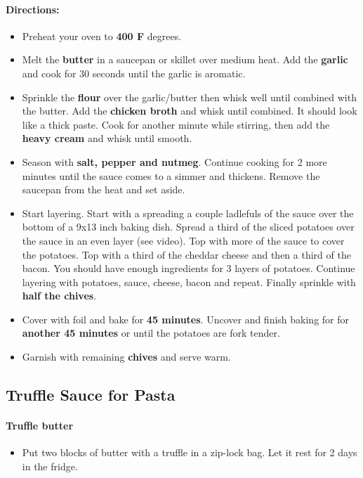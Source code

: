 \documentclass{article}
\begin{document}
\paragraph{Directions:}
\begin{itemize}
\item Preheat your oven to \textbf{400 F} degrees.
\item Melt the \textbf{butter} in a saucepan or skillet over medium heat. Add the \textbf{garlic} and cook for 30 seconds until
the garlic is aromatic.
\item Sprinkle the \textbf{flour} over the garlic/butter then whisk well until combined with the butter. Add the \textbf{chicken broth} and whisk until combined. It should look like a thick paste. Cook for another minute while stirring, then add the \textbf{heavy cream} and whisk until smooth.
\item Season with \textbf{salt, pepper and nutmeg}. Continue cooking for 2 more minutes until the sauce comes to a simmer and thickens. Remove the saucepan from the heat and set aside.
\item Start layering. Start with a spreading a couple ladlefuls of the sauce over the bottom of a 9x13 inch baking dish. Spread a third of the sliced potatoes over the sauce in an even layer (see video). Top with
more of the sauce to cover the potatoes. Top with a third of the cheddar cheese and then a third of the bacon. You should have enough ingredients for 3 layers of potatoes. Continue layering with potatoes, sauce, cheese, bacon and repeat. Finally sprinkle with \textbf{half the chives}.
\item Cover with foil and bake for \textbf{45 minutes}. Uncover and finish baking for for \textbf{another 45 minutes} or until the potatoes are fork tender.
\item Garnish with remaining \textbf{chives} and serve warm.
\end{itemize}

\subsection{Truffle Sauce for Pasta}

\paragraph{Truffle butter}
\begin{itemize}
	\item Put two blocks of butter with a truffle in a zip-lock bag. Let it rest for 2 days in the fridge.
\end{itemize}
\end{document}
